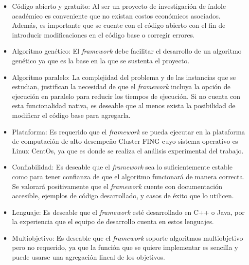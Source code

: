 \begin{itemize}
	\item Código abierto y gratuito: Al ser un proyecto de investigación de índole académico es conveniente que no existan costos económicos asociados. Además, es importante que se cuente con el código abierto con el fin de introducir modificaciones en el código base o corregir errores.
	\item Algoritmo genético: El \emph{framework} debe facilitar el desarrollo de un algoritmo genético ya que es la base en la que se sustenta el proyecto.
	\item Algoritmo paralelo: La complejidad del problema y de las instancias que se estudian, justifican la necesidad de que el \emph{framework} incluya la opción de ejecución en paralelo para reducir los tiempos de ejecución. Si no cuenta con esta funcionalidad nativa, es deseable que al menos exista la posibilidad de modificar el código base para agregarla.
	\item Plataforma: Es requerido que el \emph{framework} se pueda ejecutar en la plataforma de computación de alto desempeño Cluster FING cuyo sistema operativo es Linux CentOs, ya que es donde se realiza el análisis experimental del trabajo. 
	\item Confiabilidad: Es deseable que el \emph{framework} sea lo suficientemente estable como para tener confianza de que el algoritmo funcionará de manera correcta. Se valorará positivamente que el \emph{framework} cuente con documentación accesible, ejemplos de código desarrollado, y casos de éxito que lo utilicen.
	\item Lenguaje: Es deseable que el \emph{framework} esté desarrollado en C++ o Java, por la experiencia que el equipo de desarrollo cuenta en estos lenguajes. 
	\item Multiobjetivo: Es deseable que el \emph{framework} soporte algoritmos multiobjetivo pero no requerido, ya que la función que se quiere implementar es sencilla y puede usarse una agregación lineal de los objetivos.
\end{itemize} 

